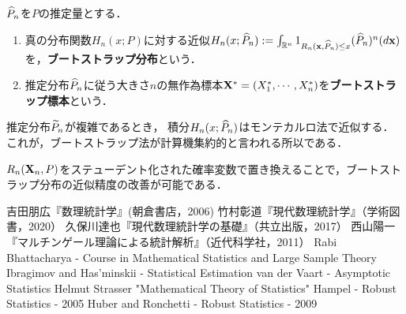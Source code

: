 \documentclass[uplatex,dvipdfmx]{jsreport}
\begin{document}
\begin{definition}
    $\widehat{P}_n$を$P$の推定量とする．
    \begin{enumerate}
        \item 真の分布関数$H_n(x;P)$に対する近似$H_n(x;\widehat{P}_n):=\int_{\mathbb{R}^n}1_{R_n(\mathbf{x},\widehat{P}_n)\le x}(\widehat{P}_n)^n(d\mathbf{x})$を，\textbf{ブートストラップ分布}という．
        \item 推定分布$\widehat{P}_n$に従う大きさ$n$の無作為標本$\mathbf{X}^*=(X^*_1,\cdots,X^*_n)$を\textbf{ブートストラップ標本}という．
    \end{enumerate}
\end{definition}
\begin{remark}
    推定分布$\widetilde{P}_n$が複雑であるとき，
    積分$H_n(x;\widehat{P}_n)$はモンテカルロ法で近似する．
    これが，ブートストラップ法が計算機集約的と言われる所以である．
\end{remark}
\begin{remark}[studentization]
    $R_n(\mathbf{X}_n,P)$をステューデント化された確率変数で置き換えることで，ブートストラップ分布の近似精度の改善が可能である．
\end{remark}

\begin{thebibliography}{99}
    吉田朋広『数理統計学』(朝倉書店，2006)
    竹村彰道『現代数理統計学』（学術図書，2020）
    久保川達也『現代数理統計学の基礎』（共立出版，2017）
    西山陽一『マルチンゲール理論による統計解析』（近代科学社，2011）
    Rabi Bhattacharya - Course in Mathematical Statistics and Large Sample Theory
    Ibragimov and Has'minskii - Statistical Estimation
    van der Vaart - Asymptotic Statistics
    Helmut Strasser "Mathematical Theory of Statistics"
    Hampel - Robust Statistics - 2005
    Huber and Ronchetti - Robust Statistics - 2009
\end{thebibliography}
\end{document}
